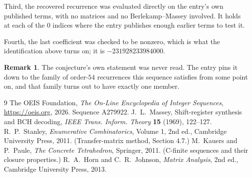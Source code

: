 \documentclass[11pt,a4paper]{article}
\theoremstyle{plain}
\theoremstyle{definition}
\newtheorem{remark}[theorem]{Remark}
\begin{document}
Third, the recovered recurrence was evaluated directly on the entry's own published terms, with
no matrices and no Berlekamp--Massey involved. It holds at each of the $0$ indices where
the entry publishes enough earlier terms to test it.

Fourth, the last coefficient was checked to be nonzero, which is what the identification above
turns on; it is $-231928233984000$.

\begin{remark}
The conjecture's own statement was never read. The entry pins it down to the family of
order-$54$ recurrences this sequence satisfies from some point on, and that family turns
out to have exactly one member.
\end{remark}

\begin{thebibliography}{9}
 The OEIS Foundation, \emph{The On-Line Encyclopedia of Integer
Sequences}, \url{https://oeis.org}, 2026. Sequence A279922.
 J.~L.~Massey, Shift-register synthesis and BCH decoding, \emph{IEEE
Trans. Inform. Theory} \textbf{15} (1969), 122--127.
 R.~P.~Stanley, \emph{Enumerative Combinatorics}, Volume 1, 2nd ed.,
Cambridge University Press, 2011. (Transfer-matrix method, Section 4.7.)
 M.~Kauers and P.~Paule, \emph{The Concrete Tetrahedron}, Springer, 2011.
(C-finite sequences and their closure properties.)
 R.~A.~Horn and C.~R.~Johnson, \emph{Matrix Analysis}, 2nd ed., Cambridge
University Press, 2013.
\end{thebibliography}
\end{document}
